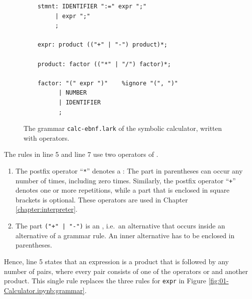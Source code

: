 \begin{figure}[!ht]
\centering
\begin{verbatim}
    stmnt: IDENTIFIER ":=" expr ";"
         | expr ";"
         ;

    expr: product (("+" | "-") product)*;

    product: factor (("*" | "/") factor)*;

    factor: "(" expr ")"    %ignore "(", ")"
          | NUMBER
          | IDENTIFIER
          ;
\end{verbatim}
\vspace*{-0.3cm}
\caption{The grammar \texttt{calc-ebnf.lark} of the symbolic calculator, written with  operators.}
\label{fig:01-Calculator-EBNF.ipynb:grammar}
\end{figure}

\noindent
The rules in line 5 and line 7 use two operators of .
\begin{enumerate}
\item The postfix operator ``\texttt{*}'' denotes a :
      The part in parentheses can occur any number of times, including zero times.  Similarly, the postfix
      operator ``\texttt{+}'' denotes one or more repetitions, while a part that is enclosed in square brackets
      is optional.  These operators are used in Chapter \ref{chapter:interpreter}.
\item The part \verb!("+" | "-")! is an , i.e.~an
      alternative that occurs inside an alternative of a grammar rule.  An inner alternative has to be enclosed
      in parentheses.
\end{enumerate}
Hence, line 5 states that an expression is a product that is followed by any number of pairs, where every
pair consists of one of the operators \squoted{+} or \squoted{-} and another product.  This single rule
replaces the three rules for \texttt{expr} in Figure \ref{fig:01-Calculator.ipynb:grammar}.

